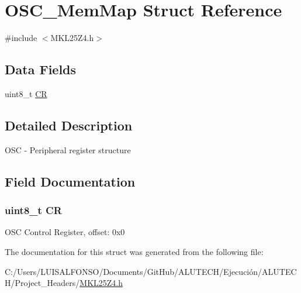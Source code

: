 \hypertarget{struct_o_s_c___mem_map}{}\section{O\+S\+C\+\_\+\+Mem\+Map Struct Reference}
\label{struct_o_s_c___mem_map}


{\ttfamily \#include $<$M\+K\+L25\+Z4.\+h$>$}

\subsection*{Data Fields}
\begin{DoxyCompactItemize}
\item 
uint8\+\_\+t \hyperlink{struct_o_s_c___mem_map_a33c47d54cdd44fb7e84b19e407383748}{C\+R}
\end{DoxyCompactItemize}


\subsection{Detailed Description}
O\+S\+C -\/ Peripheral register structure 

\subsection{Field Documentation}
\hypertarget{struct_o_s_c___mem_map_a33c47d54cdd44fb7e84b19e407383748}{}
\subsubsection[{C\+R}]{\setlength{\rightskip}{0pt plus 5cm}uint8\+\_\+t C\+R}\label{struct_o_s_c___mem_map_a33c47d54cdd44fb7e84b19e407383748}
O\+S\+C Control Register, offset\+: 0x0 

The documentation for this struct was generated from the following file\+:\begin{DoxyCompactItemize}
\item 
C\+:/\+Users/\+L\+U\+I\+S\+A\+L\+F\+O\+N\+S\+O/\+Documents/\+Git\+Hub/\+A\+L\+U\+T\+E\+C\+H/\+Ejecución/\+A\+L\+U\+T\+E\+C\+H/\+Project\+\_\+\+Headers/\hyperlink{_m_k_l25_z4_8h}{M\+K\+L25\+Z4.\+h}\end{DoxyCompactItemize}

